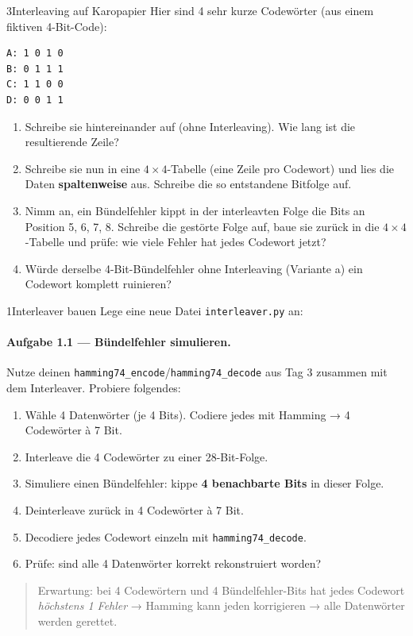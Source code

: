 \begin{bleistiftuebung}{3}{Interleaving auf Karopapier}
Hier sind 4 sehr kurze Codewörter (aus einem fiktiven 4-Bit-Code):

\begin{verbatim}
A: 1 0 1 0
B: 0 1 1 1
C: 1 1 0 0
D: 0 0 1 1
\end{verbatim}

\begin{enumerate}[label=(\alph*), leftmargin=*]
\item Schreibe sie hintereinander auf (ohne Interleaving). Wie lang
  ist die resultierende Zeile?
\item Schreibe sie nun in eine $4 \times 4$-Tabelle (eine Zeile pro
  Codewort) und lies die Daten \textbf{spaltenweise} aus. Schreibe
  die so entstandene Bitfolge auf.
\item Nimm an, ein Bündelfehler kippt in der interleavten Folge die
  Bits an Position 5, 6, 7, 8. Schreibe die gestörte Folge auf, baue
  sie zurück in die $4 \times 4$-Tabelle und prüfe: wie viele Fehler
  hat jedes Codewort jetzt?
\item Würde derselbe 4-Bit-Bündelfehler ohne Interleaving (Variante a)
  ein Codewort komplett ruinieren?
\end{enumerate}
\end{bleistiftuebung}

\begin{pythoneinheit}{1}{Interleaver bauen}
Lege eine neue Datei \texttt{interleaver.py} an:


\paragraph{Aufgabe 1.1 — Bündelfehler simulieren.}
Nutze deinen \texttt{hamming74\_encode}/\texttt{hamming74\_decode} aus
Tag 3 zusammen mit dem Interleaver. Probiere folgendes:

\begin{enumerate}
\item Wähle 4 Datenwörter (je 4 Bits). Codiere jedes mit Hamming → 4
  Codewörter à 7 Bit.
\item Interleave die 4 Codewörter zu einer 28-Bit-Folge.
\item Simuliere einen Bündelfehler: kippe \textbf{4 benachbarte Bits}
  in dieser Folge.
\item Deinterleave zurück in 4 Codewörter à 7 Bit.
\item Decodiere jedes Codewort einzeln mit
  \texttt{hamming74\_decode}.
\item Prüfe: sind alle 4 Datenwörter korrekt rekonstruiert worden?
\end{enumerate}

\begin{quote}
Erwartung: bei 4 Codewörtern und 4 Bündelfehler-Bits hat jedes
Codewort \emph{höchstens 1 Fehler} → Hamming kann jeden korrigieren →
alle Datenwörter werden gerettet.
\end{quote}
\end{pythoneinheit}

